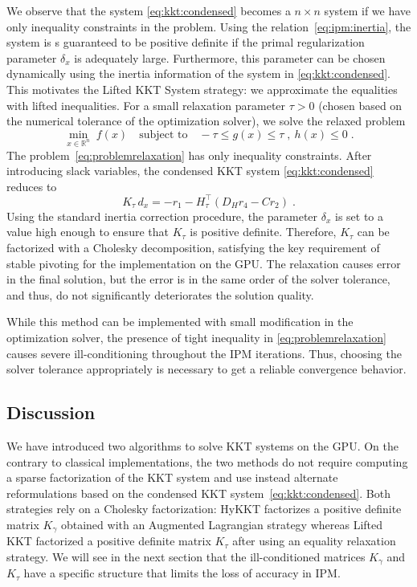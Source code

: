 We observe that the system \eqref{eq:kkt:condensed} becomes
a $n\times n$ system if we have only inequality constraints in the problem.
Using the relation~\eqref{eq:ipm:inertia}, the system
is s guaranteed to be positive definite if the primal regularization parameter $\delta_x$ is adequately large.
Furthermore, this parameter can be chosen dynamically using the inertia information of the system in \eqref{eq:kkt:condensed}. This motivates the Lifted KKT System strategy: we approximate the equalities with lifted inequalities.
For a small relaxation parameter $\tau > 0$ (chosen based on the numerical tolerance of the optimization solver), we solve the relaxed problem
\begin{equation}
  \label{eq:problemrelaxation}
    \min_{x \in \mathbb{R}^n} \;  f(x)
\quad \text{subject to}\quad
     - \tau \leq g(x) \leq \tau \;,~  h(x) \leq 0  \; .
\end{equation}
The problem~\eqref{eq:problemrelaxation} has only inequality constraints. After introducing slack variables, the condensed KKT system
\eqref{eq:kkt:condensed} reduces to
\begin{equation}
  \label{eq:liftedkkt}
    K_\tau \,d_x = - r_1 - H_\tau^\top(D_H r_4 - C r_2) \; .
\end{equation}
Using the standard inertia correction procedure, the parameter $\delta_x$ is set to a value high enough to ensure that  $K_\tau$ is positive definite. Therefore, $K_\tau$ can be factorized with a Cholesky decomposition, satisfying the key requirement of stable pivoting for the implementation on the GPU. The relaxation causes error in the final solution, but the error is in the same order of the solver tolerance, and thus, do not significantly deteriorates the solution quality.

While this method can be implemented with small modification in the optimization solver, the presence of tight inequality in \eqref{eq:problemrelaxation} causes severe ill-conditioning throughout the IPM iterations. Thus,
choosing the solver tolerance appropriately is necessary to get a reliable convergence behavior.


\subsection{Discussion}
We have introduced two algorithms to solve
KKT systems on the GPU. On the contrary to classical implementations,
the two methods do not require computing a sparse \lblt factorization of the KKT
system and use instead alternate reformulations based on the condensed KKT
system~\eqref{eq:kkt:condensed}. Both strategies
rely on a Cholesky factorization: HyKKT factorizes a positive
definite matrix $K_\gamma$ obtained with an Augmented Lagrangian strategy
whereas Lifted KKT factorized a positive definite matrix $K_\tau$
after using an equality relaxation strategy.
We will see in the next section that the ill-conditioned matrices $K_\gamma$ and $K_\tau$
have a specific structure that limits the loss of accuracy in IPM.


